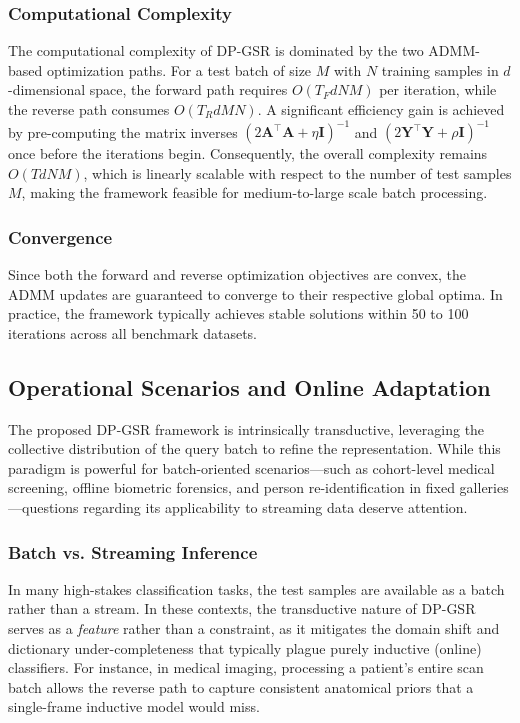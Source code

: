 \documentclass[10pt,comsoc]{IEEEtran}
\begin{document}
\subsubsection{Computational Complexity}
The computational complexity of DP-GSR is dominated by the two ADMM-based optimization paths. For a test batch of size $M$ with $N$ training samples in $d$-dimensional space, the forward path requires $O(T_F dNM)$ per iteration, while the reverse path consumes $O(T_R dMN)$. A significant efficiency gain is achieved by pre-computing the matrix inverses $(2\mathbf{A}^\top\mathbf{A} + \eta \mathbf{I})^{-1}$ and $(2\mathbf{Y}^\top\mathbf{Y} + \rho \mathbf{I})^{-1}$ once before the iterations begin. Consequently, the overall complexity remains $O(T dNM)$, which is linearly scalable with respect to the number of test samples $M$, making the framework feasible for medium-to-large scale batch processing.

\subsubsection{Convergence}
Since both the forward and reverse optimization objectives are convex, the ADMM updates are guaranteed to converge to their respective global optima. In practice, the framework typically achieves stable solutions within 50 to 100 iterations across all benchmark datasets.


\subsection{Operational Scenarios and Online Adaptation}
The proposed DP-GSR framework is intrinsically transductive, leveraging the collective distribution of the query batch to refine the representation. While this paradigm is powerful for batch-oriented scenarios---such as cohort-level medical screening, offline biometric forensics, and person re-identification in fixed galleries---questions regarding its applicability to streaming data deserve attention.

\subsubsection{Batch vs. Streaming Inference}
In many high-stakes classification tasks, the test samples are available as a batch rather than a stream. In these contexts, the transductive nature of DP-GSR serves as a \textit{feature} rather than a constraint, as it mitigates the domain shift and dictionary under-completeness that typically plague purely inductive (online) classifiers. For instance, in medical imaging, processing a patient's entire scan batch allows the reverse path to capture consistent anatomical priors that a single-frame inductive model would miss.
\end{document}
